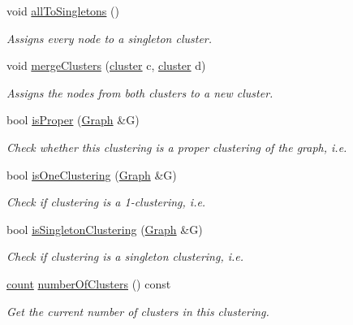 \begin{DoxyCompactItemize}
void \hyperlink{class_networ_kit_1_1_clustering_a777f65aa262cbed40eb1c85721250026}{all\-To\-Singletons} ()
\begin{DoxyCompactList}\small\item\em Assigns every node to a singleton cluster. \end{DoxyCompactList}\item 
void \hyperlink{class_networ_kit_1_1_clustering_a24c93a541401003305e358bb03682d22}{merge\-Clusters} (\hyperlink{namespace_networ_kit_aee72806475c8d37642866ab18aceab8b}{cluster} c, \hyperlink{namespace_networ_kit_aee72806475c8d37642866ab18aceab8b}{cluster} d)
\begin{DoxyCompactList}\small\item\em Assigns the nodes from both clusters to a new cluster. \end{DoxyCompactList}\item 
bool \hyperlink{class_networ_kit_1_1_clustering_a65ee5f83e25a5e3ccae11c98eb55a7b8}{is\-Proper} (\hyperlink{class_networ_kit_1_1_graph}{Graph} \&G)
\begin{DoxyCompactList}\small\item\em Check whether this clustering is a proper clustering of the graph, i.\-e. \end{DoxyCompactList}\item 
bool \hyperlink{class_networ_kit_1_1_clustering_a11ce4cb3018fd1cdf7d7269cc8a71448}{is\-One\-Clustering} (\hyperlink{class_networ_kit_1_1_graph}{Graph} \&G)
\begin{DoxyCompactList}\small\item\em Check if clustering is a 1-\/clustering, i.\-e. \end{DoxyCompactList}\item 
bool \hyperlink{class_networ_kit_1_1_clustering_acd4d66f85e524baa081ca6e1306de290}{is\-Singleton\-Clustering} (\hyperlink{class_networ_kit_1_1_graph}{Graph} \&G)
\begin{DoxyCompactList}\small\item\em Check if clustering is a singleton clustering, i.\-e. \end{DoxyCompactList}\item 
\hyperlink{namespace_networ_kit_ad4c536a5339a8bf2f91f418b9a67a7d8}{count} \hyperlink{class_networ_kit_1_1_clustering_a5d70e71e3c6b0082c0ab4035e1b65f79}{number\-Of\-Clusters} () const 
\begin{DoxyCompactList}\small\item\em Get the current number of clusters in this clustering. \end{DoxyCompactList}\item 

\end{DoxyCompactItemize}
